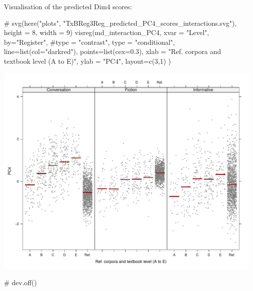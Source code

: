 \documentclass[
  letterpaper,
  DIV=11,
  numbers=noendperiod]{scrreprt}
\newenvironment{Shaded}{\begin{snugshade}}{\end{snugshade}}
\newcommand{\AttributeTok}[1]{\textcolor[rgb]{0.40,0.45,0.13}{#1}}
\newcommand{\CommentTok}[1]{\textcolor[rgb]{0.37,0.37,0.37}{#1}}
\newcommand{\DecValTok}[1]{\textcolor[rgb]{0.68,0.00,0.00}{#1}}
\newcommand{\FloatTok}[1]{\textcolor[rgb]{0.68,0.00,0.00}{#1}}
\newcommand{\FunctionTok}[1]{\textcolor[rgb]{0.28,0.35,0.67}{#1}}
\newcommand{\NormalTok}[1]{\textcolor[rgb]{0.00,0.23,0.31}{#1}}
\newcommand{\StringTok}[1]{\textcolor[rgb]{0.13,0.47,0.30}{#1}}
\begin{document}
Visualisation of the predicted Dim4 scores:

\begin{Shaded}
\begin{Highlighting}[]
\CommentTok{\# svg(here("plots", "TxBReg3Reg\_predicted\_PC4\_scores\_interactions.svg"), height = 8, width = 9)}
\FunctionTok{visreg}\NormalTok{(md\_interaction\_PC4, }\AttributeTok{xvar =} \StringTok{"Level"}\NormalTok{, }\AttributeTok{by=}\StringTok{"Register"}\NormalTok{, }
       \CommentTok{\#type = "contrast",}
       \AttributeTok{type =} \StringTok{"conditional"}\NormalTok{,}
       \AttributeTok{line=}\FunctionTok{list}\NormalTok{(}\AttributeTok{col=}\StringTok{"darkred"}\NormalTok{), }
       \AttributeTok{points=}\FunctionTok{list}\NormalTok{(}\AttributeTok{cex=}\FloatTok{0.3}\NormalTok{),}
       \AttributeTok{xlab =} \StringTok{"Ref. corpora and textbook level (A to E)"}\NormalTok{, }\AttributeTok{ylab =} \StringTok{"PC4"}\NormalTok{,}
       \AttributeTok{layout=}\FunctionTok{c}\NormalTok{(}\DecValTok{3}\NormalTok{,}\DecValTok{1}\NormalTok{)}
\NormalTok{)}
\end{Highlighting}
\end{Shaded}

\includegraphics{AppendixH_files/figure-pdf/Dim4estimateplots-1.pdf}

\begin{Shaded}
\begin{Highlighting}[]
\CommentTok{\# dev.off()}
\end{Highlighting}
\end{Shaded}
\end{document}
